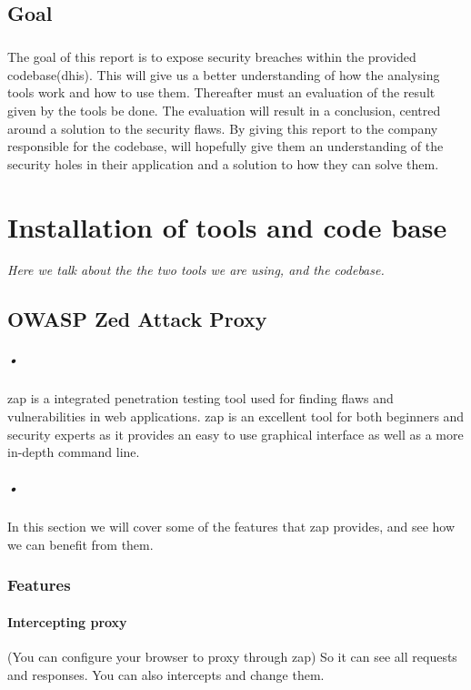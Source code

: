 \documentclass[11pt,english,a4paper]{report}
\begin{document}
\section{Goal}
\paragraph{}
The goal of this report is to expose security breaches within the provided codebase(\gls{dhis}). This will give us a better understanding of how the analysing tools work and how to use them. Thereafter must an evaluation of the result given by the tools be done. The evaluation will result in a conclusion, centred around a solution to the security flaws. By giving this report to the company responsible for the codebase, will hopefully give them an understanding of the security holes in their application and a solution to how they can solve them.

\chapter{Installation of tools and code base}
\textit{Here we talk about the the two tools we are using, and the codebase.}
\section{OWASP Zed Attack Proxy}
\paragraph{•}
\gls{zap} is a integrated penetration testing tool used for finding flaws and vulnerabilities in web applications. \gls{zap} is an excellent tool for both beginners and security experts as it provides an easy to use graphical interface as well as a more in-depth command line.
\paragraph{•}
In this section we will cover some of the features that \gls{zap} provides, and see how we can benefit from them.
\subsection{Features}
\subsubsection{Intercepting proxy}
(You can configure your browser to proxy through zap) So it can see all requests and responses. You can also intercepts and change them.
\end{document}

